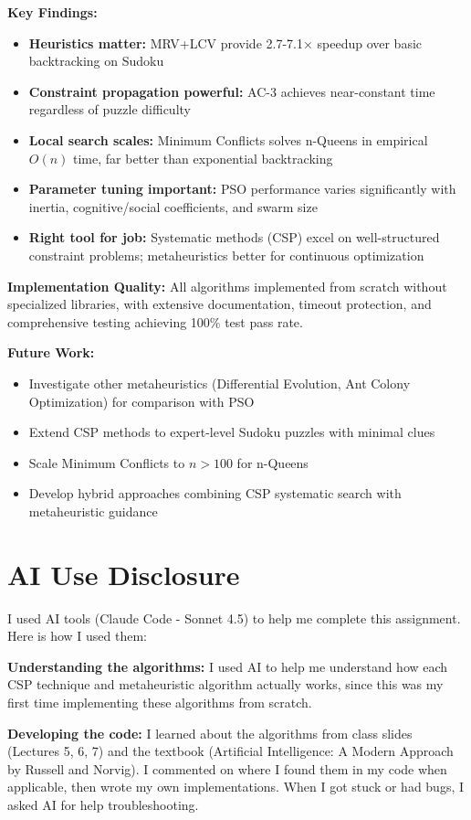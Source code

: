\documentclass[letterpaper]{article}
\begin{document}
\textbf{Key Findings:}
\begin{itemize}
\item \textbf{Heuristics matter:} MRV+LCV provide 2.7-7.1× speedup over basic backtracking on Sudoku
\item \textbf{Constraint propagation powerful:} AC-3 achieves near-constant time regardless of puzzle difficulty
\item \textbf{Local search scales:} Minimum Conflicts solves n-Queens in empirical $O(n)$ time, far better than exponential backtracking
\item \textbf{Parameter tuning important:} PSO performance varies significantly with inertia, cognitive/social coefficients, and swarm size
\item \textbf{Right tool for job:} Systematic methods (CSP) excel on well-structured constraint problems; metaheuristics better for continuous optimization
\end{itemize}

\textbf{Implementation Quality:}
All algorithms implemented from scratch without specialized libraries, with extensive documentation, timeout protection, and comprehensive testing achieving 100\% test pass rate.

\textbf{Future Work:}
\begin{itemize}
\item Investigate other metaheuristics (Differential Evolution, Ant Colony Optimization) for comparison with PSO
\item Extend CSP methods to expert-level Sudoku puzzles with minimal clues
\item Scale Minimum Conflicts to $n > 100$ for n-Queens
\item Develop hybrid approaches combining CSP systematic search with metaheuristic guidance
\end{itemize}

\section{AI Use Disclosure}

I used AI tools (Claude Code - Sonnet 4.5) to help me complete this assignment. Here is how I used them:

\textbf{Understanding the algorithms:} I used AI to help me understand how each CSP technique and metaheuristic algorithm actually works, since this was my first time implementing these algorithms from scratch.

\textbf{Developing the code:} I learned about the algorithms from class slides (Lectures 5, 6, 7) and the textbook (Artificial Intelligence: A Modern Approach by Russell and Norvig). I commented on where I found them in my code when applicable, then wrote my own implementations. When I got stuck or had bugs, I asked AI for help troubleshooting.
\end{document}
